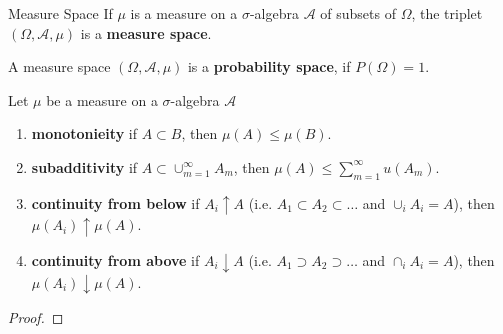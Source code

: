 \begin{definition}{Measure Space}{}
    If $\mu$ is a measure on a $\sigma$-algebra $\mathcal{A}$ of subsets of $\Omega$, the triplet $(\Omega,\mathcal{A},\mu)$ is a \textbf{measure space}.
\end{definition}

\begin{note}
    A measure space $(\Omega,\mathcal{A},\mu)$ is a \textbf{probability space}, if $P(\Omega)=1$.
\end{note}

\begin{property}
    Let $\mu$ be a measure on a $\sigma$-algebra $\mathcal{A}$
    \begin{enumerate}
        \item \textbf{monotonieity} if $A\subset B$, then $\mu(A)\leq\mu(B)$.
        \item \textbf{subadditivity} if $A\subset\cup_{m=1}^{\infty} A_m$, then $\mu(A)\leq\sum_{m=1}^{\infty}  u(A_m)$.
        \item \textbf{continuity from below} if $A_i\uparrow A$ (i.e. $A_1\subset A_2\subset \ldots$ and $\cup_iA_i=A$), then $\mu(A_i)\uparrow \mu(A)$.
        \item \textbf{continuity from above} if $A_i\downarrow A$ (i.e. $A_1\supset A_2\supset \ldots$ and $\cap_iA_i=A$), then $\mu(A_i)\downarrow \mu(A)$.
    \end{enumerate}
\end{property}

\begin{proof}

\end{proof}
